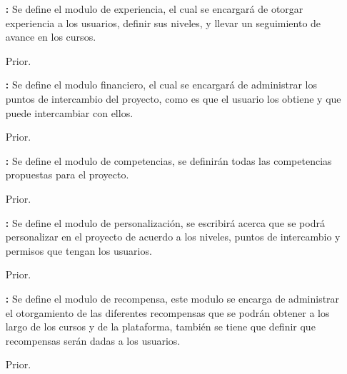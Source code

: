 \begin{multicols}{2}
\begin{itemize}
    	\item[\bf \ida] {\bf \desc:} Se define el modulo de experiencia, el cual se encargará de otorgar experiencia a los usuarios, definir sus niveles, y llevar un seguimiento de avance en los cursos.
        \item[Prior.] \Valor
\end{itemize}

\begin{itemize}
    	\item[\bf \ida] {\bf \desc:} Se define el modulo financiero, el cual se encargará de administrar los puntos de intercambio del proyecto, como es que el usuario los obtiene y que puede intercambiar con ellos.
        \item[Prior.] \Valor
\end{itemize}

\begin{itemize}
    	\item[\bf \ida] {\bf \desc:} Se define el modulo de competencias, se definirán todas las competencias propuestas para el proyecto.
        \item[Prior.] \Valor
\end{itemize}

\begin{itemize}
    	\item[\bf \ida] {\bf \desc:} Se define el modulo de personalización, se escribirá acerca que se podrá personalizar en el proyecto de acuerdo a los niveles, puntos de intercambio y permisos que tengan los usuarios.
        \item[Prior.] \Valor
\end{itemize}

\begin{itemize}
    	\item[\bf \ida] {\bf \desc:} Se define el modulo de recompensa, este modulo se encarga de administrar el otorgamiento de las diferentes recompensas que se podrán obtener a los largo de los cursos y de la plataforma, también se tiene que definir que recompensas serán dadas a los usuarios.
        \item[Prior.] \Valor
\end{itemize}


\end{multicols}
